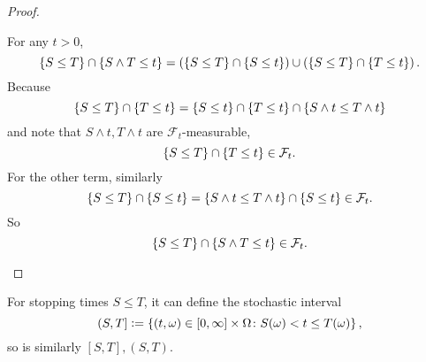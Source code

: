 \begin{proof}
\begin{enumerate}[label=(\arabic{*})]
        \noindent For any $t > 0$,
        \begin{equation*}
            \left\{S \leq T\right\} \cap \left\{S \wedge T \leq t\right\} = \left(\left\{S \leq T\right\} \cap\left\{S \leq t\right\}\right) \cup \left(\left\{S \leq T\right\} \cap\left\{T \leq t\right\}\right).
        \end{equation*}
        Because
        \begin{equation*}
            \left\{S \leq T\right\} \cap \left\{T \leq t\right\} = \left\{S \leq t\right\} \cap \left\{T \leq t\right\} \cap \left\{S \wedge t \leq T \wedge t\right\} 
        \end{equation*}
        and note that $S \wedge t,T \wedge t$ are $\mathcal{F}_t$-measurable,
        \begin{equation*}
            \left\{S \leq T\right\} \cap \left\{T \leq t\right\} \in \mathcal{F}_t.
        \end{equation*}
        For the other term, similarly
        \begin{equation*}
            \left\{S \leq T\right\} \cap \left\{S \leq t\right\} = \left\{S \wedge t \leq T \wedge t\right\}  \cap \left\{S \leq t\right\} \in \mathcal{F}_t.
        \end{equation*}
        So
        \begin{equation*}
            \left\{S \leq T\right\} \cap \left\{S \wedge T \leq t\right\} \in \mathcal{F}_t. \qedhere
        \end{equation*}
    \end{enumerate}
\end{proof}
\begin{rmk}
    For stopping times $S \leq T$, it can define the stochastic interval
    \begin{equation*}
        (S,T] \vcentcolon= \left\{(t,\omega) \in [0,\infty] \times \Omega \colon S(\omega) < t \leq T(\omega)\right\},
    \end{equation*}
    so is similarly $[S,T],(S,T)$.
\end{rmk}

